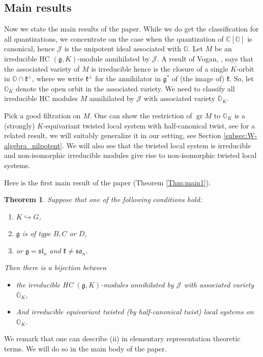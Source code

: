 \documentclass[12pt]{amsart}
\newcommand{\C}{\mathbb{C}}
\newcommand{\J}{\mathcal{J}}
\newcommand{\g}{\mathfrak{g}}
\newcommand{\Orb}{\mathbb{O}}
\newcommand{\gr}{\operatorname{gr}}
\newcommand{\kf}{\mathfrak{k}}
\newcommand{\slf}{\mathfrak{sl}}
\newtheorem{Thm}{Theorem}[subsection]
\theoremstyle{definition}
\numberwithin{equation}{section}
\begin{document}
\subsection{Main results}
Now we state the main results of the paper. While we do get the classification for all quantizations,  we concentrate on the case when
the quantization of $\C[\Orb]$ is canonical, hence $\J$ is the unipotent ideal associated
with $\Orb$. Let $M$ be an irreducible HC $(\g,K)$-module
annihilated by $\J$.
A result of Vogan, \cite[Theorem 1.2]{Vogan}, says that the associated variety of $M$ is irreducible
hence is the closure of a single $K$-orbit in $\Orb\cap \kf^\perp$, where we write $\kf^\perp$
for the annihilator in $\g^*$ of (the image of) $\kf$. So, let $\Orb_K$ denote the open
orbit in the associated variety. We need to classify all irreducible HC modules $M$ annihilated by $\J$ with associated variety
$\overline{\Orb}_K$.

Pick a good filtration on $M$. One can show the restriction of $\gr M$ to $\Orb_K$ is a (strongly) $K$-equivariant twisted local system with half-canonical twist, see \cite[Theorem 8.7]{Vogan} for a related result, we will suitably generalize it in our setting, see Section \ref{subsec:W-algebra_nilpotent}.  We will also see that the twisted local system is irreducible and non-isomorphic irreducible
modules give rise to non-isomorphic twisted local systems.

Here is the first main result of the paper (Theorem \ref{Thm:main1}).

\begin{Thm}\label{Thm:omnibus}
Suppose that one of the following conditions hold:
\begin{enumerate}
\item $K\hookrightarrow G$,
\item $\g$ is of type $B,C$ or $D$,
\item or $\g=\slf_n$  and $\kf\neq \mathfrak{so}_n$.
\end{enumerate}
Then there is a bijection between
\begin{itemize}
\item[(i)]
the irreducible HC $(\g,K)$-modules annihilated by $\J$
with associated variety $\overline{\Orb}_K$,
\item[(ii)] And irreducible equivariant twisted (by half-canonical twist) local systems
on $\Orb_K$.
\end{itemize}
\end{Thm}

We remark that one can describe (ii) in elementary representation theoretic terms.
We will do so in the main body of the paper.
\end{document}
